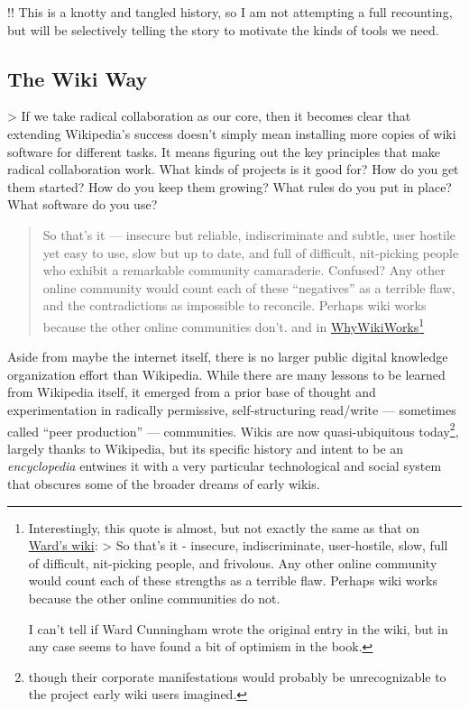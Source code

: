 \documentclass[notoc]{tufte-book}
\begin{document}
!! This is a knotty and tangled history, so I am not attempting a full
recounting, but will be selectively telling the story to motivate the
kinds of tools we need.






\subsection{The Wiki Way}



 \textgreater{} If we take radical collaboration as our
core, then it becomes clear that extending Wikipedia's success doesn't
simply mean installing more copies of wiki software for different tasks.
It means figuring out the key principles that make radical collaboration
work. What kinds of projects is it good for? How do you get them
started? How do you keep them growing? What rules do you put in place?
What software do you use? \citep{swartzMakingMoreWikipedias2006} 

\begin{quote}
So that's it --- insecure but reliable, indiscriminate and subtle, user
hostile yet easy to use, slow but up to date, and full of difficult,
nit-picking people who exhibit a remarkable community camaraderie.
Confused? Any other online community would count each of these
``negatives'' as a terrible flaw, and the contradictions as impossible
to reconcile. Perhaps wiki works because the other online communities
don't. \citep{leufWikiWayQuick2001a, -l, 329}  and in
\href{http://wiki.c2.com/?WhyWikiWorks}{WhyWikiWorks}\footnote{Interestingly,
  this quote is almost, but not exactly the same as that on
  \href{http://wiki.c2.com/?WhyWikiWorks}{Ward's wiki}: \textgreater{}
  So that's it - insecure, indiscriminate, user-hostile, slow, full of
  difficult, nit-picking people, and frivolous. Any other online
  community would count each of these strengths as a terrible flaw.
  Perhaps wiki works because the other online communities do not.

  I can't tell if Ward Cunningham wrote the original entry in the wiki,
  but in any case seems to have found a bit of optimism in the book.}
\end{quote}

Aside from maybe the internet itself, there is no larger public digital
knowledge organization effort than Wikipedia. While there are many
lessons to be learned from Wikipedia itself, it emerged from a prior
base of thought and experimentation in radically permissive,
self-structuring read/write --- sometimes called ``peer production''
\citep{hillWikipediaEndOpen2019}  --- communities. Wikis are now
quasi-ubiquitous today\footnote{though their corporate manifestations
  would probably be unrecognizable to the project early wiki users
  imagined.}, largely thanks to Wikipedia, but its specific history and
intent to be an \emph{encyclopedia} entwines it with a very particular
technological and social system that obscures some of the broader dreams
of early wikis.
\end{document}
